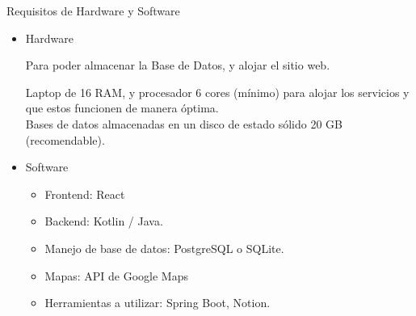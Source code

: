 {\Large \color{Naranja}Requisitos de Hardware y Software}



\begin{itemize}[label=\textcolor{Lotus}{$\triangleright$}]
    \item {
        {\large \color{Purpura}Hardware}

        Para poder almacenar la Base de Datos, y alojar el sitio web.
        
        Laptop de 16 RAM, y procesador 6 cores (mínimo) para alojar los servicios y que estos funcionen de manera óptima.\\
        Bases de datos almacenadas en un disco de estado sólido 20 GB (recomendable).
        
    }
    
    \item {
        {\large \color{Purpura}Software}
        \begin{itemize}[label=\textcolor{Lotus}{$\triangleright$}]
            \item Frontend: React\\
            \item Backend: Kotlin / Java.\\
            \item Manejo de base de datos: PostgreSQL o SQLite.\\
            \item Mapas: API de Google Maps \\
            \item Herramientas a utilizar: Spring Boot, Notion. \\
        \end{itemize}
        
    }
\end{itemize}